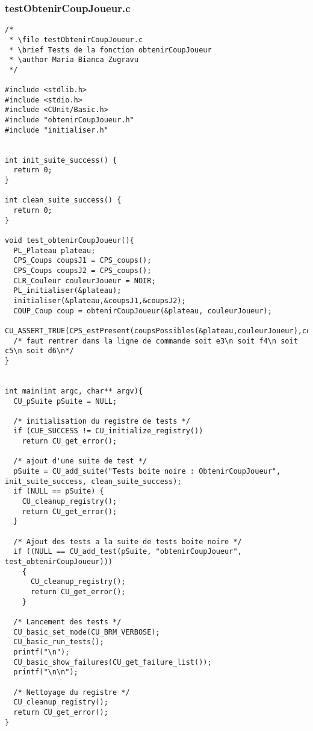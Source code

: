 \subsubsection{testObtenirCoupJoueur.c}
\begin{lstlisting}
/*
 * \file testObtenirCoupJoueur.c
 * \brief Tests de la fonction obtenirCoupJoueur
 * \author Maria Bianca Zugravu
 */

#include <stdlib.h>
#include <stdio.h>
#include <CUnit/Basic.h>
#include "obtenirCoupJoueur.h"
#include "initialiser.h"


int init_suite_success() {
  return 0;
}

int clean_suite_success() {
  return 0;
}

void test_obtenirCoupJoueur(){
  PL_Plateau plateau;
  CPS_Coups coupsJ1 = CPS_coups();
  CPS_Coups coupsJ2 = CPS_coups();
  CLR_Couleur couleurJoueur = NOIR;
  PL_initialiser(&plateau);
  initialiser(&plateau,&coupsJ1,&coupsJ2);
  COUP_Coup coup = obtenirCoupJoueur(&plateau, couleurJoueur);
  CU_ASSERT_TRUE(CPS_estPresent(coupsPossibles(&plateau,couleurJoueur),coup));
  /* faut rentrer dans la ligne de commande soit e3\n soit f4\n soit c5\n soit d6\n*/
}


int main(int argc, char** argv){
  CU_pSuite pSuite = NULL;

  /* initialisation du registre de tests */
  if (CUE_SUCCESS != CU_initialize_registry())
    return CU_get_error();

  /* ajout d'une suite de test */
  pSuite = CU_add_suite("Tests boite noire : ObtenirCoupJoueur", init_suite_success, clean_suite_success);
  if (NULL == pSuite) {
    CU_cleanup_registry();
    return CU_get_error();
  }

  /* Ajout des tests a la suite de tests boite noire */
  if ((NULL == CU_add_test(pSuite, "obtenirCoupJoueur", test_obtenirCoupJoueur)))
    {
      CU_cleanup_registry();
      return CU_get_error();
    }

  /* Lancement des tests */
  CU_basic_set_mode(CU_BRM_VERBOSE);
  CU_basic_run_tests();
  printf("\n");
  CU_basic_show_failures(CU_get_failure_list());
  printf("\n\n");

  /* Nettoyage du registre */
  CU_cleanup_registry();
  return CU_get_error();
}
\end{lstlisting}

